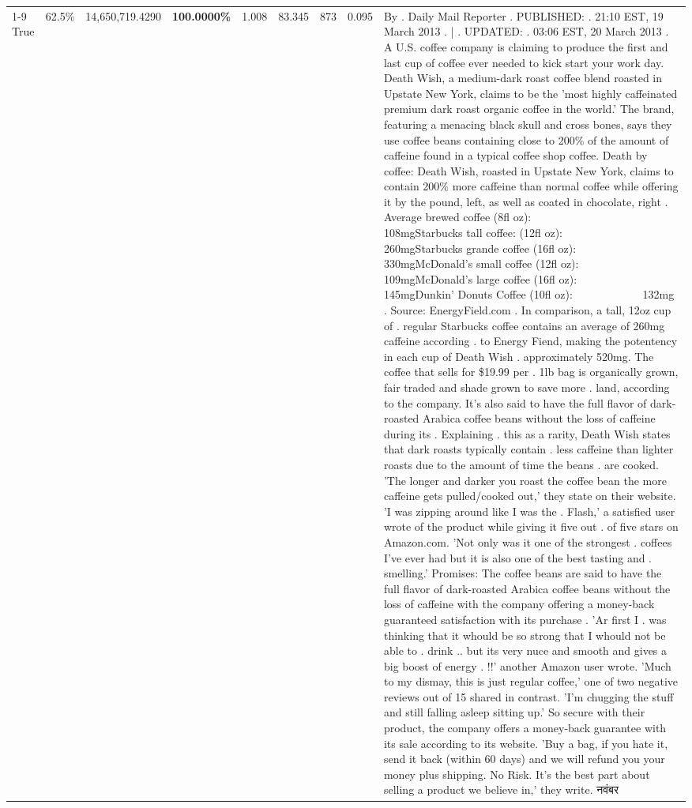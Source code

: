 \begin{table}[H]
{\begin{tabular}{lllrlllll}
\cline{1-9} \cline{2-9}
True & 62.5\% & 14,650,719.4290 & \bfseries \color{red} 100.0000\% & 1.008 & 83.345 & 873 & 0.095 & By . Daily Mail Reporter . PUBLISHED: . 21:10 EST, 19 March 2013 . | . UPDATED: . 03:06 EST, 20 March 2013 . A U.S. coffee company is claiming to produce the first and last cup of coffee ever needed to kick start your work day. Death Wish, a medium-dark roast coffee blend roasted in Upstate New York, claims to be the 'most highly caffeinated premium dark roast organic coffee in the world.' The brand, featuring a menacing black skull and cross bones, says they use coffee beans containing close to 200\% of the amount of caffeine found in a typical coffee shop coffee. Death by coffee: Death Wish, roasted in Upstate New York, claims to contain 200\% more caffeine than normal coffee while offering it by the pound, left, as well as coated in chocolate, right . Average brewed coffee (8fl oz):              108mgStarbucks tall coffee: (12fl oz):                260mgStarbucks grande coffee (16fl oz):         330mgMcDonald's small coffee (12fl oz):           109mgMcDonald's large coffee (16fl oz):           145mgDunkin' Donuts Coffee (10fl oz):             132mg . Source: EnergyField.com . In comparison, a tall, 12oz cup of . regular Starbucks coffee contains an average of 260mg caffeine according . to Energy Fiend, making the potentency in each cup of Death Wish . approximately 520mg. The coffee that sells for \$19.99 per . 1lb bag is organically grown, fair traded and shade grown to save more . land, according to the company. It's also said to have the full flavor of dark-roasted Arabica coffee beans without the loss of caffeine during its . Explaining . this as a rarity, Death Wish states that dark roasts typically contain . less caffeine than lighter roasts due to the amount of time the beans . are cooked. 'The longer and darker you roast the coffee bean the more caffeine gets pulled/cooked out,' they state on their website. 'I was zipping around like I was the . Flash,' a satisfied user wrote of the product while giving it five out . of five stars on Amazon.com. 'Not only was it one of the strongest . coffees I've ever had but it is also one of the best tasting and . smelling.’ Promises: The coffee beans are said to have the full flavor of dark-roasted Arabica coffee beans without the loss of caffeine with the company offering a money-back guaranteed satisfaction with its purchase . 'Ar first I . was thinking that it whould be so strong that I whould not be able to . drink .. but its very nuce and smooth and gives a big boost of energy . !!' another Amazon user wrote. 'Much to my dismay, this is just regular coffee,' one of two negative reviews out of 15 shared in contrast. 'I'm chugging the stuff and still falling asleep sitting up.' So secure with their product, the company offers a money-back guarantee with its sale according to its website. 'Buy a bag, if you hate it, send it back (within 60 days) and we will refund you your money plus shipping. No Risk. It’s the best part about selling a product we believe in,' they write. नवंबर \\

\end{tabular}}
\end{table}
